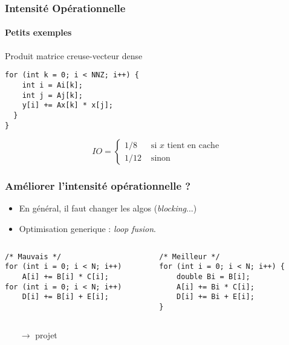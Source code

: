 \documentclass[xcolor={x11names,svgnames}]{beamer}
\begin{document}

\begin{frame}[fragile]
  \frametitle{Intensité Opérationnelle}
  \framesubtitle{Petits exemples}
  
  \begin{block}{Produit matrice creuse-vecteur dense}
\begin{verbatim}
for (int k = 0; i < NNZ; i++) {
    int i = Ai[k];
    int j = Aj[k];
    y[i] += Ax[k] * x[j];
  }
}
\end{verbatim}
  \end{block}

  \pause

  \[
    IO = \begin{cases}
      1 / 8  & \text{ si $x$ tient en cache} \\
      1 / 12 & \text{ sinon}
    \end{cases}
  \]  
\end{frame}


\begin{frame}[fragile]
  \frametitle{Améliorer l'intensité opérationnelle ?}

  \begin{itemize}
  \item En général, il faut changer les algos (\emph{blocking}...)
  \item Optimisation generique : \emph{loop fusion}.
  \end{itemize}

  \bigskip
  
  \begin{columns}[T]
    \begin{column}{0.5\textwidth}
\begin{verbatim}
/* Mauvais */
for (int i = 0; i < N; i++)
    A[i] += B[i] * C[i];
for (int i = 0; i < N; i++)
    D[i] += B[i] + E[i];
\end{verbatim}
    \end{column}
    \begin{column}{0.5\textwidth}
\begin{verbatim}
/* Meilleur */
for (int i = 0; i < N; i++) {
    double Bi = B[i];
    A[i] += Bi * C[i];
    D[i] += Bi + E[i];
}
\end{verbatim}
    \end{column}
  \end{columns}

  \begin{itemize}
  \item[$\rightarrow$] projet 
  \end{itemize}
\end{frame}
\end{document}
